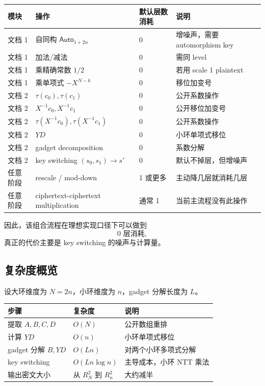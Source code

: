 \documentclass[11pt]{article}
\newcommand{\Auto}{\mathsf{Auto}}
\begin{document}
\begin{center}
\begin{tabular}{llll}
\toprule
模块 & 操作 & 默认层数消耗 & 说明 \\
\midrule
文档 1 & 自同构 $\Auto_{1+2n}$ & 0 & 增噪声，需要 automorphism key \\
文档 1 & 加法/减法 & 0 & 需同 level \\
文档 1 & 乘精确常数 $1/2$ & 0 & 若用 scale 1 plaintext \\
文档 1 & 乘单项式 $-X^{N-k}$ & 0 & 移位加变号 \\
文档 2 & $\tau(c_0),\tau(c_1)$ & 0 & 公开系数操作 \\
文档 2 & $X^{-1}c_0,X^{-1}c_1$ & 0 & 公开移位加变号 \\
文档 2 & $\tau(X^{-1}c_0),\tau(X^{-1}c_1)$ & 0 & 公开系数操作 \\
文档 2 & $YD$ & 0 & 小环单项式移位 \\
文档 2 & gadget decomposition & 0 & 系数分解 \\
文档 2 & key switching $(s_0,s_1)\to s'$ & 0 & 默认不掉层，但增噪声 \\
任意阶段 & rescale / mod-down & 1 或更多 & 主动降几层就消耗几层 \\
任意阶段 & ciphertext-ciphertext multiplication & 通常 1 & 当前主流程没有此操作 \\
\bottomrule
\end{tabular}
\end{center}

因此，该组合流程在理想实现口径下可以做到
\[
\boxed{0\text{ 层消耗}},
\]
真正的代价主要是 key switching 的噪声与计算量。

\subsection{复杂度概览}

设大环维度为 $N=2n$，小环维度为 $n$，gadget 分解长度为 $L$。

\begin{center}
\begin{tabular}{lll}
\toprule
步骤 & 复杂度 & 说明 \\
\midrule
提取 $A,B,C,D$ & $O(N)$ & 公开数组重排 \\
计算 $YD$ & $O(n)$ & 小环单项式移位 \\
gadget 分解 $B,YD$ & $O(Ln)$ & 对两个小环多项式分解 \\
key switching & $O(Ln\log n)$ & 主导成本，小环 NTT 乘法 \\
输出密文大小 & 从 $R_N^2$ 到 $R_n^2$ & 大约减半 \\
\bottomrule
\end{tabular}
\end{center}
\end{document}
